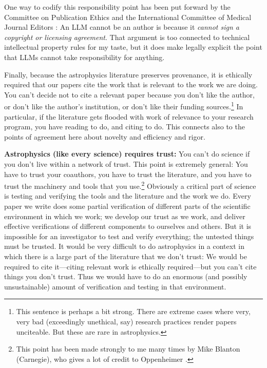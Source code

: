 \documentclass{article}
\newcommand{\paragraphskip}{\medskip}
\renewcommand{\paragraph}[1]{\par\paragraphskip\noindent\textbf{#1}}
\begin{document}
One way to codify this responsibility point has been put forward by the Committee on Publication Ethics \cite{cope} and the International Committee of Medical Journal Editors \cite{icmje}:
An LLM cannot be an author is because it \emph{cannot sign a copyright or licensing agreement}.
That argument is too connected to technical intellectual property rules for my taste, but it does make legally explicit the point that LLMs cannot take responsibility for anything.

Finally, because the astrophysics literature preserves provenance, it is ethically required that our papers cite the work that is relevant to the work we are doing.
You can't decide not to cite a relevant paper because you don't like the author, or don't like the author's institution, or don't like their funding sources.\footnote{%
This sentence is perhaps a bit strong.
There are extreme cases where very, very bad (exceedingly unethical, say) research practices render papers unciteable.
But these are rare in astrophysics.}
In particular, if the literature gets flooded with work of relevance to your research program, you have reading to do, and citing to do.
This connects also to the points of agreement here about novelty and efficiency and rigor.

\paragraph{Astrophysics (like every science) requires trust:}
You can't do science if you don't live within a network of trust.
This point is extremely general: You have to trust your coauthors, you have to trust the literature, and you have to trust the machinery and tools that you use.\footnote{%
This point has been made strongly to me many times by Mike Blanton (Carnegie), who gives a lot of credit to Oppenheimer \cite{oppy}.}
Obviously a critical part of science is testing and verifying the tools and the literature and the work we do.
Every paper we write does some partial verification of different parts of the scientific environment in which we work; we develop our trust as we work, and deliver effective verifications of different components to ourselves and others.
But it is impossible for an investigator to test and verify everything; the untested things must be trusted.
It would be very difficult to do astrophysics in a context in which there is a large part of the literature that we don't trust:
We would be required to cite it---citing relevant work is ethically required---but you can't cite things you don't trust.
Thus we would have to do an enormous (and possibly unsustainable) amount of verification and testing in that environment.
\end{document}
